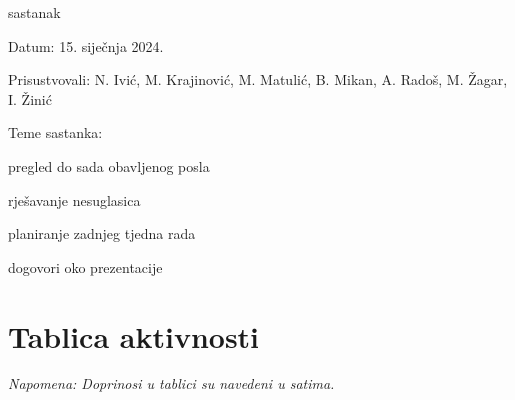 \begin{packed_enum}
			\item  sastanak
			\item[] \begin{packed_item}
				\item Datum: 15. siječnja 2024.
				\item Prisustvovali: N. Ivić, M. Krajinović, M. Matulić, B. Mikan, A. Radoš, M. Žagar, I. Žinić
				\item Teme sastanka:
				\begin{packed_item}
					\item  pregled do sada obavljenog posla
					\item  rješavanje nesuglasica
					\item  planiranje zadnjeg tjedna rada
					\item  dogovori oko prezentacije
				\end{packed_item}
			\end{packed_item}
			
			
		\end{packed_enum}
		
		\eject
		\section*{Tablica aktivnosti}
		
			
			 \textit{Napomena: Doprinosi u tablici su navedeni u satima.}


